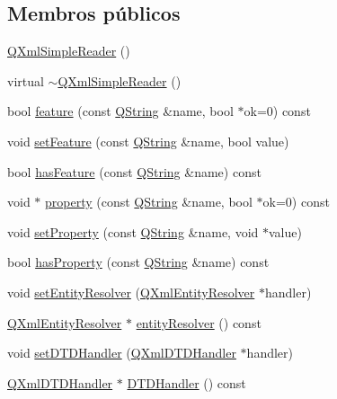 \subsection*{Membros públicos}
\begin{DoxyCompactItemize}
\item 
\hyperlink{class_q_xml_simple_reader_a34aab7c21fb390ebbfe7474ffbe37470}{Q\-Xml\-Simple\-Reader} ()
\item 
virtual \hyperlink{class_q_xml_simple_reader_ae5fda45ec6e8cb93fa078dd9cfb226bd}{$\sim$\-Q\-Xml\-Simple\-Reader} ()
\item 
bool \hyperlink{class_q_xml_simple_reader_a9a1e05fd936ba5c6f2008c8a35a65b79}{feature} (const \hyperlink{class_q_string}{Q\-String} \&name, bool $\ast$ok=0) const 
\item 
void \hyperlink{class_q_xml_simple_reader_a021e5cc111d248f309deec45253e2c17}{set\-Feature} (const \hyperlink{class_q_string}{Q\-String} \&name, bool value)
\item 
bool \hyperlink{class_q_xml_simple_reader_ac7528ced6524ec818c704adf956ba44e}{has\-Feature} (const \hyperlink{class_q_string}{Q\-String} \&name) const 
\item 
void $\ast$ \hyperlink{class_q_xml_simple_reader_aa66e1061ce3ad44d8e0bb8e5e89e0141}{property} (const \hyperlink{class_q_string}{Q\-String} \&name, bool $\ast$ok=0) const 
\item 
void \hyperlink{class_q_xml_simple_reader_aeed13d669b6ac55e522ab26a1f1c620a}{set\-Property} (const \hyperlink{class_q_string}{Q\-String} \&name, void $\ast$value)
\item 
bool \hyperlink{class_q_xml_simple_reader_a5e8c175fdedcecb196b464d1338226a9}{has\-Property} (const \hyperlink{class_q_string}{Q\-String} \&name) const 
\item 
void \hyperlink{class_q_xml_simple_reader_a0483a48d872324ba566d6375bd72e6ca}{set\-Entity\-Resolver} (\hyperlink{class_q_xml_entity_resolver}{Q\-Xml\-Entity\-Resolver} $\ast$handler)
\item 
\hyperlink{class_q_xml_entity_resolver}{Q\-Xml\-Entity\-Resolver} $\ast$ \hyperlink{class_q_xml_simple_reader_a0816509b82ad1f43e225c7dda1f95f39}{entity\-Resolver} () const 
\item 
void \hyperlink{class_q_xml_simple_reader_a769f683d88886d01067e9a04654ec829}{set\-D\-T\-D\-Handler} (\hyperlink{class_q_xml_d_t_d_handler}{Q\-Xml\-D\-T\-D\-Handler} $\ast$handler)
\item 
\hyperlink{class_q_xml_d_t_d_handler}{Q\-Xml\-D\-T\-D\-Handler} $\ast$ \hyperlink{class_q_xml_simple_reader_ae188d2575905cc532c201679826d92a7}{D\-T\-D\-Handler} () const 

\end{DoxyCompactItemize}
